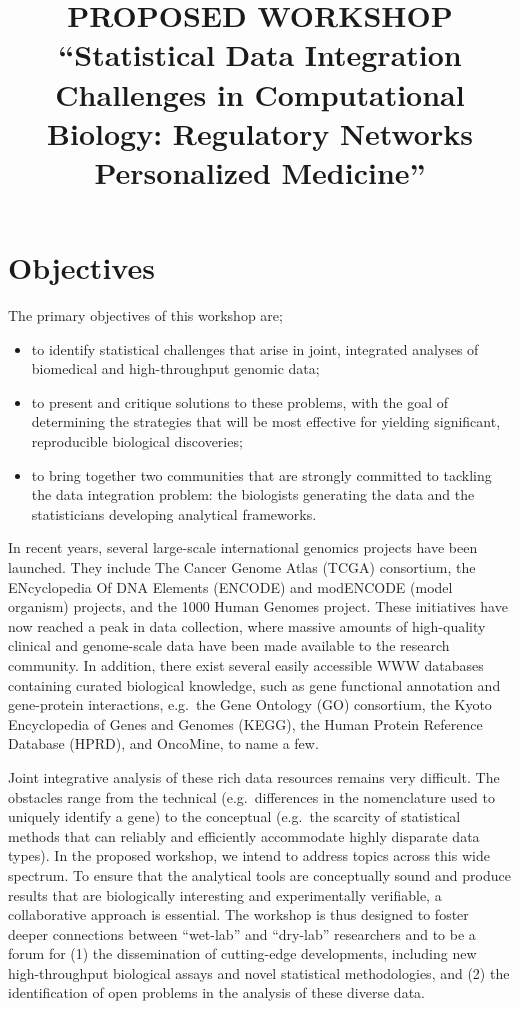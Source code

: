\documentclass[12pt]{amsart}
\title[Statistical Data Integration Challenges in Computational Biology]{PROPOSED
  WORKSHOP ``Statistical Data Integration Challenges in Computational
  Biology: Regulatory Networks Personalized Medicine''}
\begin{document}
\maketitle

\section*{Objectives}
The primary objectives of this workshop are;
\begin{itemize}
\item to identify statistical challenges that arise in joint,
  integrated analyses of biomedical and high-throughput genomic data;
\item to present and critique solutions to these problems, with the
  goal of determining the strategies that will be most effective for
  yielding significant, reproducible biological discoveries;
\item to bring together two communities that are strongly committed to
  tackling the data integration problem: the biologists generating the
  data and the statisticians developing analytical frameworks.
\end{itemize}

In recent years, several large-scale international genomics projects
have been launched.  They include The Cancer Genome Atlas (TCGA)
consortium, the ENcyclopedia Of DNA Elements (ENCODE) and modENCODE
(model organism) projects, and the 1000 Human Genomes project. These
initiatives have now reached a peak in data collection, where massive
amounts of high-quality clinical and genome-scale data have been made
available to the research community. In addition, there exist
several easily accessible WWW databases containing curated biological
knowledge, such as gene functional annotation and gene-protein
interactions, e.g.\ the Gene Ontology (GO) consortium, the Kyoto
Encyclopedia of Genes and Genomes (KEGG), the Human Protein Reference
Database (HPRD), and OncoMine, to name a few.

Joint integrative analysis of these rich data resources remains very
difficult. The obstacles range from the technical (e.g.\ differences
in the nomenclature used to uniquely identify a gene) to the
conceptual (e.g.\ the scarcity of statistical methods that can
reliably and efficiently accommodate highly disparate data types). In
the proposed workshop, we intend to address topics across this wide
spectrum. To ensure that the analytical tools are conceptually sound
and produce results that are biologically interesting and
experimentally verifiable, a collaborative approach is essential.
The workshop is thus designed to foster deeper connections between
``wet-lab'' and ``dry-lab'' researchers and to be a forum for (1) the
dissemination of cutting-edge developments, including new
high-throughput biological assays and novel statistical methodologies,
and (2) the identification of open problems in the analysis of these
diverse data.
\end{document}
